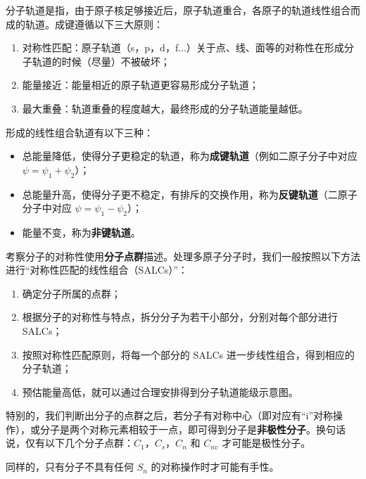 
分子轨道是指，由于原子核足够接近后，原子轨道重合，各原子的轨道线性组合而成的轨道。成键遵循以下三大原则：
\begin{enumerate}
\item 对称性匹配：原子轨道（s，p，d，f...）关于点、线、面等的对称性在形成分子轨道的时候（尽量）不被破坏；
\item 能量接近：能量相近的原子轨道更容易形成分子轨道；
\item 最大重叠：轨道重叠的程度越大，最终形成的分子轨道能量越低。
\end{enumerate}

形成的线性组合轨道有以下三种：
\begin{itemize}
\item 总能量降低，使得分子更稳定的轨道，称为\textbf{成键轨道}（例如二原子分子中对应 $\psi = \psi_1 + \psi_2$）；
\item 总能量升高，使得分子更不稳定，有排斥的交换作用，称为\textbf{反键轨道}（二原子分子中对应 $\psi = \psi_1 - \psi_2$）；
\item 能量不变，称为\textbf{非键轨道}。
\end{itemize}

考察分子的对称性使用\textbf{分子点群}描述。处理多原子分子时，我们一般按照以下方法进行“对称性匹配的线性组合（SALCs）”：
\begin{enumerate}
\item 确定分子所属的点群；
\item 根据分子的对称性与特点，拆分分子为若干小部分，分别对每个部分进行 SALCs；
\item 按照对称性匹配原则，将每一个部分的 SALCs 进一步线性组合，得到相应的分子轨道；
\item 预估能量高低，就可以通过合理安排得到分子轨道能级示意图。
\end{enumerate}

特别的，我们判断出分子的点群之后，若分子有对称中心（即对应有“i”对称操作），或分子是两个对称元素相较于一点，即可得到分子是\textbf{非极性分子}。换句话说，仅有以下几个分子点群：$C_1$，$C_s$，$C_n$ 和 $C_{nv}$ 才可能是极性分子。

同样的，只有分子不具有任何 $S_n$ 的对称操作时才可能有手性。


